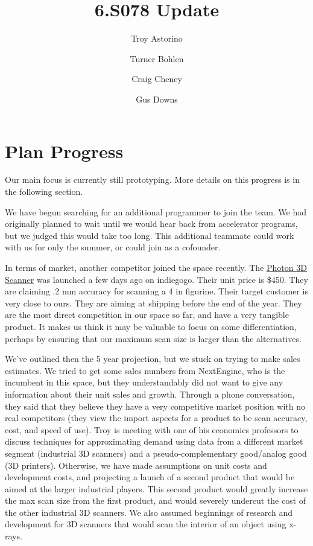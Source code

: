 \documentclass[10pt]{article}
\title{\vspace{-4em}6.S078 Update}
\author{Troy Astorino \and Turner Bohlen \and Craig Cheney \and Gus Downs}
\begin{document}
\maketitle
\vspace{-4em}

\section{Plan Progress}
Our main focus is currently still prototyping.  More details on this progress is
in the following section.

We have begun searching for an additional programmer to join the team. We had
originally planned to wait until we would hear back from accelerator programs,
but we judged this would take too long. This additional teammate could work with
us for only the summer, or could join as a cofounder.

In terms of market, another competitor joined the space recently. The \href{http://www.indiegogo.com/projects/photon-3d-scanner}{Photon 3D
Scanner} was launched a few
days ago on indiegogo. Their unit price is \$450. They are claiming .2 mm
accuracy for scanning a 4 in figurine. Their target customer is very close to
ours. They are aiming at shipping before the end of the year. They are the most
direct competition in our space so far, and have a very tangible product.  It
makes us think it may be valuable to focus on some differentiation, perhaps by
ensuring that our maximum scan size is larger than the alternatives.

We've outlined then the 5 year projection, but we stuck on trying to make sales
estimates. We tried to get some sales numbers from NextEngine, who is the
incumbent in this space, but they understandably did not want to give any
information about their unit sales and growth. Through a phone conversation,
they said that they believe they have a very competitive market position with no
real competitors (they view the import aspects for a product to be scan
accuracy, cost, and speed of use). Troy is meeting with one of his economics
professors to discuss techniques for approximating demand using data from a
different market segment (industrial 3D scanners) and a pseudo-complementary
good/analog good (3D printers).  Otherwise, we have made assumptions on unit
costs and development costs, and projecting a launch of a second product that
would be aimed at the larger industrial players.  This second product would
greatly increase the max scan size from the first product, and would severely
undercut the cost of the other industrial 3D scanners.  We also assumed
beginnings of research and development for 3D scanners that would scan the
interior of an object using x-rays.
\end{document}

